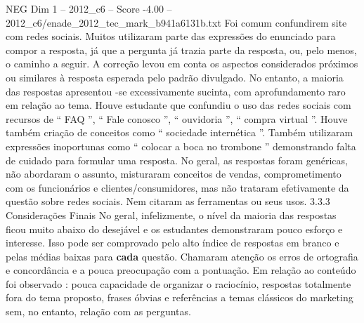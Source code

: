 \begin{textsample}{NEG Dim 1 – 2012\_c6 – Score -4.00 – 2012\_c6/enade\_2012\_tec\_mark\_b941a6131b.txt}
Foi comum confundirem site com redes sociais.
Muitos utilizaram parte das expressões do enunciado para compor a resposta, já que a pergunta já trazia parte da resposta, ou, pelo menos, o caminho a seguir.
A correção levou em conta os aspectos considerados próximos ou similares à resposta esperada pelo padrão divulgado.
No entanto, a maioria das respostas apresentou -se excessivamente sucinta, com aprofundamento raro em relação ao tema.
Houve estudante que confundiu o uso das redes sociais com recursos de “ FAQ ”, “ Fale conosco ”, “ ouvidoria ”, “ compra virtual ”.
Houve também criação de conceitos como “ sociedade internética ”.
Também utilizaram expressões inoportunas como “ colocar a boca no trombone ” demonstrando falta de cuidado para formular uma resposta.
No geral, as respostas foram genéricas, não abordaram o assunto, misturaram conceitos de vendas, comprometimento com os funcionários e clientes/consumidores, mas não trataram efetivamente da questão sobre redes sociais.
Nem citaram as ferramentas ou seus usos. 3.3.3 Considerações Finais No geral, infelizmente, o nível da maioria das respostas ficou muito abaixo do desejável e os estudantes demonstraram pouco esforço e interesse.
Isso pode ser comprovado pelo alto índice de respostas em branco e pelas médias baixas para \textbf{cada} questão.
Chamaram atenção os erros de ortografia e concordância e a pouca preocupação com a pontuação.
Em relação ao conteúdo foi observado : pouca capacidade de organizar o raciocínio, respostas totalmente fora do tema proposto, frases óbvias e referências a temas clássicos do marketing sem, no entanto, relação com as perguntas.

\end{textsample}
